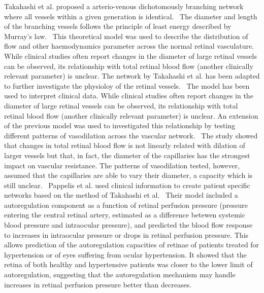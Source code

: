 \documentclass[12pt,a4paper]{journal}
\begin{document}
Takahashi et al. proposed a arterio-venous dichotomously branching network where all vessels within a given generation is identical.~\cite{Takahashi_2009}
The diameter and length of the branching vessels follows the principle of least energy described by Murray's law.~\cite{Murray_1926}
This theoretical model was used to describe the distribution of flow and other haemodynamics parameter across the normal retinal vasculature.
While clinical studies often report changes in the diameter of large retinal vessels can be observed, its relationship with total retinal blood flow (another clinically relevant parameter) is unclear.
The network by Takahashi et al. has been adapted to further investigate the physioloy of the retinal vessels.~\cite{Aschinger_2017,Pappelis_2020}
The model has been used to interpret clinical data.
While clinical studies often report changes in the diameter of large retinal vessels can be observed, its relationship with total retinal blood flow (another clinically relevant parameter) is unclear.
An extension of the previous model was used to investigated this relationship by testing different patterns of vasodilation across the vascular network.~\cite{Aschinger_2017}
The study showed that changes in total retinal blood flow is not linearly related with dilation of larger vessels but that, in fact, the diameter of the capillaries has the strongest impact on vascular resistance.
The patterns of vasodilation tested, however, assumed that the capillaries are able to vary their diameter, a capacity which is still unclear.~\cite{Kur_2012}
Pappelis et al. used clinical information to create patient specific networks based on the method of Takahashi et al.~\cite{Pappelis_2020}
Their model included a autoregulation component as a function of retinal perfusion pressure (pressure entering the central retinal artery, estimated as a difference betewen systemic blood pressure and intraocular pressure), and predicted the blood flow response to increases in intraocular pressure or drops in retinal perfusion pressure.
This allows prediction of the autoregulation capacities of retinae of patients treated for hypertension or of eyes suffering from ocular hypertension.
It showed that the retina of both healthy and hypertensive patients was closer to the lower limit of autoregulation, suggesting that the autoregulation mechanism may handle increases in retinal perfusion pressure better than decreases.~\cite{Pappelis_2020}
\end{document}
